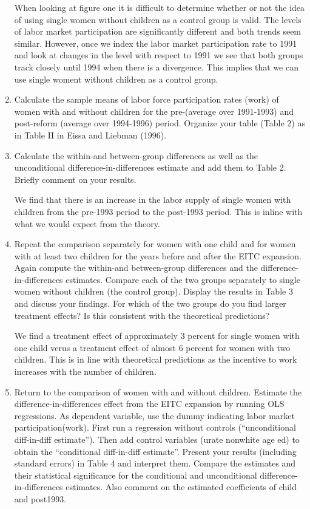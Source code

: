 \documentclass{article}
\begin{document}
\begin{enumerate}[label=\alph*]
When looking at figure one it is difficult to determine whether or not the idea of using single women without children as a control group is valid.  The levels of labor market participation are significantly different and both trends seem similar.  However, once we index the labor market participation rate to 1991 and look at changes in the level with respect to 1991 we see that both groups track closely until 1994 when there is a divergence.  This implies that we can use single woment without children as a control group.

\item Calculate the sample means of labor force participation rates (work) of women with and without children for the pre-(average over 1991-1993) and post-reform (average over 1994-1996) period. Organize your table (Table 2) as in Table II in Eissa and Liebman (1996).

\item Calculate the within-and between-group differences as well as the unconditional difference-in-differences estimate and add them to Table 2. Briefly comment on your results.


We find that there is an increase in the labor supply of single women with children from the pre-1993 period to the post-1993 period.  This is inline with what we would expect from the theory.

\item  Repeat the comparison separately for women with one child and for women with at least two children for the years before and after the EITC expansion. Again compute the within-and between-group differences and the difference-in-differences estimates. Compare each of the two groups separately to single women without children (the control group). Display the results in Table 3 and discuss your findings. For which of the two groups do you find larger treatment effects? Is this consistent with the theoretical predictions?

We find a treatment effect of approximately 3 percent for single women with one child verus a treatment effect of almost 6 percent for women with two children.  This is in line with theoretical predictions as the incentive to work increases with the number of children.



\item Return to the comparison of women with and without children. Estimate the difference-in-differences effect from the EITC expansion by running OLS regressions. As dependent variable, use the dummy indicating labor market participation(work). First run a regression without controls (“unconditional diff-in-diff estimate”). Then add control variables (urate nonwhite age ed) to obtain the “conditional diff-in-diff estimate”. Present your results (including standard errors) in Table 4 and interpret them. Compare the estimates and their statistical significance for the conditional and unconditional difference-in-differences estimates. Also comment on the estimated coefficients of child and post1993.


\end{enumerate}
\end{document}
